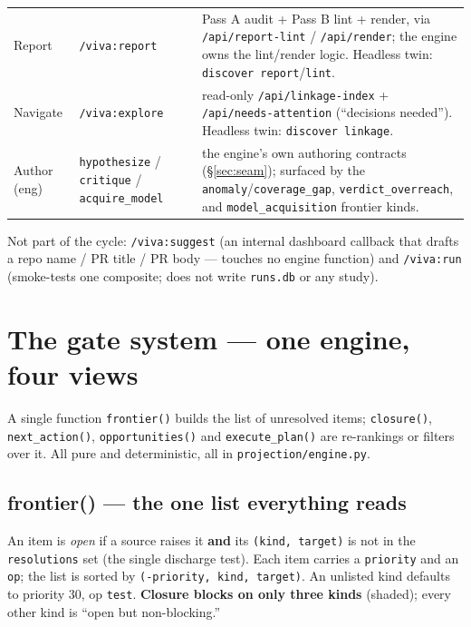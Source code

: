\documentclass[11pt]{article}
\newcommand{\code}[1]{\texttt{\small #1}}
\begin{document}
\begin{center}
\begin{tabularx}{\textwidth}{@{}l l Y@{}}
Report         & \code{/viva:report} & Pass A audit + Pass B lint + render, via \code{/api/report-lint} / \code{/api/render}; the engine owns the lint/render logic. Headless twin: \code{discover report}/\code{lint}.\\
Navigate       & \code{/viva:explore} & read-only \code{/api/linkage-index} + \code{/api/needs-attention} (``decisions needed''). Headless twin: \code{discover linkage}.\\
Author (eng)   & \code{hypothesize} / \code{critique} / \code{acquire\_model} & the engine's own authoring contracts (\S\ref{sec:seam}); surfaced by the \code{anomaly}/\code{coverage\_gap}, \code{verdict\_overreach}, and \code{model\_acquisition} frontier kinds.\\
\bottomrule
\end{tabularx}
\end{center}

{\footnotesize Not part of the cycle: \code{/viva:suggest} (an internal dashboard callback that
drafts a repo name / PR title / PR body --- touches no engine function) and \code{/viva:run}
(smoke-tests one composite; does not write \code{runs.db} or any study).}

\section{The gate system --- one engine, four views}\label{sec:gates}

A single function \code{frontier()} builds the list of unresolved items; \code{closure()},
\code{next\_action()}, \code{opportunities()} and \code{execute\_plan()} are re-rankings or
filters over it. All pure and deterministic, all in \code{projection/engine.py}.

\subsection*{frontier() --- the one list everything reads}
An item is \emph{open} if a source raises it \textbf{and} its \code{(kind, target)} is not in the
\code{resolutions} set (the single discharge test). Each item carries a \code{priority} and an
\code{op}; the list is sorted by \code{(-priority, kind, target)}. An unlisted kind defaults to
priority 30, op \code{test}. \textbf{Closure blocks on only three kinds} (shaded); every other
kind is ``open but non-blocking.''
\end{document}
